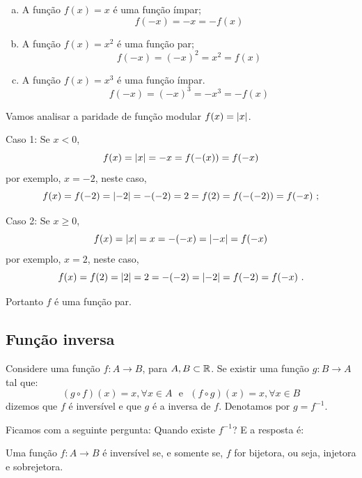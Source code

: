  \begin{exem}
  \begin{enumerate}[a)]
   \item A função $f(x)= x$ é uma função ímpar;
   \[f(-x)= -x= -f(x) \]
   \item A função $f(x)= x^2$ é uma função par;
   \[f(-x)= (-x)^2= x^2 = f(x) \]
   \item A função $f(x)= x^3$ é uma função ímpar.
   \[f(-x)= (-x)^3= -x^3= -f(x)\]
  \end{enumerate}
 \end{exem}

 \begin{exem}
  Vamos analisar a paridade de função modular $f(x)= \left|x\right|$.

  Caso 1: Se $x < 0$,
  \[f(x)= \left|x\right|= -x= f(-(x))= f(-x)\]
  por exemplo, $x= -2$, neste caso,
  \[f(x)= f(-2)= \left|-2\right|= -(-2)= 2= f(2)= f(-(-2))= f(-x) \ ;\]

  Caso 2: Se $x \geq 0$,
  \[f(x)= \left|x\right|= x= -(-x)= \left|-x\right|= f(-x)\]
  por exemplo, $x= 2$, neste caso,
  \[f(x)= f(2)= \left|2\right|= 2= -(-2)= \left|-2\right|= f(-2)= f(-x) \ .\]

  Portanto $f$ é uma função par.
 \end{exem}


  \subsection{Função inversa}

 Considere uma função $f: A \rightarrow B$, para $A, B \subset \mathbb{R}$. Se existir uma função $g: B \rightarrow A$ tal que:
 \[(g \circ f)(x)= x, \forall x \in A \ \ \ \text {e} \ \ \
 (f \circ g)(x)= x, \forall x \in B\]
 dizemos que $f$ é inversível e que $g$ é a inversa de $f$. Denotamos por $g= f^{-1}$.

 Ficamos com a seguinte pergunta: Quando existe $f^{-1}$? E a resposta é:

 \vskip0.3cm

 \colorbox{azul}{
 \begin{minipage}{0.9\linewidth}
 \begin{center}
 Uma função $f: A \to B$ é inversível se, e somente se, $f$ for bijetora, ou seja, injetora e sobrejetora.
 \end{center}
 \end{minipage}}

 \vskip0.3cm

